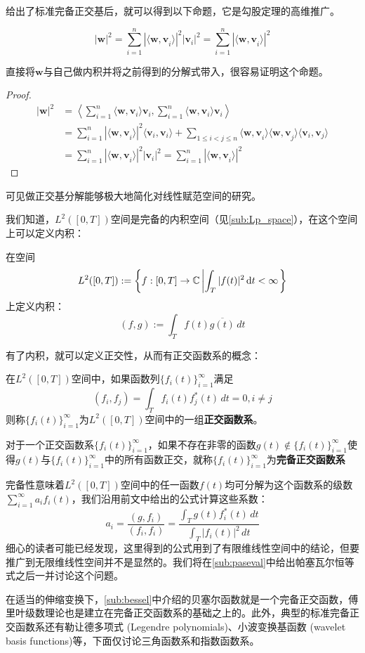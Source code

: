 给出了标准完备正交基后，就可以得到以下命题，它是勾股定理的高维推广。
\begin{proposition}
    \[|\mathbf{w}|^2=\sum_{i=1}^{n}|\langle\mathbf{w,v}_i\rangle|^2|\mathbf{v}_i|^2=\sum_{i=1}^{n}|\langle\mathbf{w,v}_i\rangle|^2\]
\end{proposition}
直接将$\mathbf{w}$与自己做内积并将之前得到的分解式带入，很容易证明这个命题。
\begin{proof}\begin{align*}
    |\mathbf{w}|^2 & =\left\langle \sum_{i=1}^{n}\langle \mathbf{w},\mathbf{v}_i\rangle \mathbf{v}_i,\sum_{i=1}^{n}\langle \mathbf{w},\mathbf{v}_i\rangle \mathbf{v}_i\right\rangle                                           \\
                   & =\sum_{i=1}^{n}|\langle\mathbf{w,v}_i\rangle|^2\langle\mathbf{v}_i,\mathbf{v}_i\rangle+\sum_{1\leq i<j\leq n}\langle \mathbf{w,v}_i\rangle\langle \mathbf{w,v}_j\rangle\langle \mathbf{v}_i,\mathbf{v}_j\rangle \\
                   & =\sum_{i=1}^{n}|\langle\mathbf{w,v}_i\rangle|^2|\mathbf{v}_i|^2=\sum_{i=1}^{n}|\langle\mathbf{w,v}_i\rangle|^2
\end{align*}\end{proof}
可见做正交基分解能够极大地简化对线性赋范空间的研究。

我们知道，$L^2([0,T])$空间是完备的内积空间（见\ref{sub:Lp_space}），在这个空间上可以定义内积：
\begin{definition}[函数空间上的内积]
    在空间\[L^2([0,T]):=\left\{f:[0,T]\rightarrow \mathbb{C} \left| \int_{T}|f(t)|^2\,\text dt<\infty\right.\right\}\]
上定义内积：
\[(f,g):=\int_{T}f(t)\overline{g(t)}\,dt \]
\end{definition}

有了内积，就可以定义正交性，从而有正交函数系的概念：
\begin{definition}[正交函数系]
    在$L^2([0,T])$空间中，如果函数列$\{f_i(t)\}_{i=1}^{\infty}$满足
\[(f_i,f_j)=\int_{T}f_i(t)f_j^*(t)\,dt=0,i\neq j\]
则称$\{f_i(t)\}_{i=1}^{\infty}$为$L^2([0,T])$空间中的一组\textbf{正交函数系}。
\end{definition}

\begin{definition}[完备正交函数系]
    对于一个正交函数系$\{f_i(t)\}_{i=1}^{\infty}$，如果不存在非零的函数$g(t)\notin\{f_i(t)\}_{i=1}^{\infty}$使得$g(t)$与$\{f_i(t)\}_{i=1}^{\infty}$中的所有函数正交，就称$\{f_i(t)\}_{i=1}^{\infty}$为\textbf{完备正交函数系}
\end{definition}

完备性意味着$L^2([0,T])$空间中的任一函数$f(t)$均可分解为这个函数系的级数$\sum_{i = 1}^{\infty}  a_i f_i(t)$，我们沿用前文中给出的公式计算这些系数：
\[a_i=\frac{(g,f_i)}{(f_i,f_i)}=\frac{\int_{T}g(t)f_i^*(t)\,dt}{\int_{T}|f_i(t)|^2\,dt}\]
细心的读者可能已经发现，这里得到的公式用到了有限维线性空间中的结论，但要推广到无限维线性空间并不是显然的。我们将在\ref{sub:paseval}中给出帕塞瓦尔恒等式之后一并讨论这个问题。

在适当的伸缩变换下，\ref{sub:bessel}中介绍的贝塞尔函数就是一个完备正交函数，傅里叶级数理论也是建立在完备正交函数系的基础之上的。此外，典型的标准完备正交函数系还有勒让德多项式 (Legendre polynomials)、小波变换基函数 (wavelet basis functions)等，下面仅讨论三角函数系和指数函数系。
